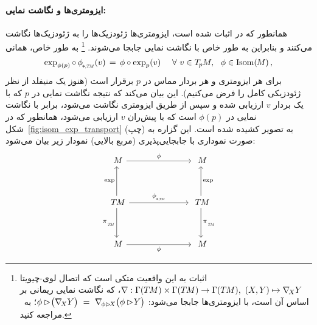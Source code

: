 \paragraph{ایزومتری‌ها و نگاشت نمایی:}
همانطور که در \cite{gallier2019diffgeom1} اثبات شده است، ایزومتری‌ها ژئودزیک‌ها را به ژئودزیک‌ها نگاشت می‌کنند و بنابراین به طور خاص با نگاشت نمایی جابجا می‌شوند.%
\footnote{\label{footnote:LeviCivita_isometry_invariance_persian}
    اثبات به این واقعیت متکی است که اتصال لوی-چیویتا $\nabla: \Gamma(T\mkern-1.5muM) \times \Gamma(T\mkern-1.5muM) \to \Gamma(T\mkern-1.5muM),\ (X,Y)\mapsto \nabla_{\!X}Y$، که نگاشت نمایی ریمانی بر اساس آن است، با ایزومتری‌ها جابجا می‌شود:
    $\phi\rhd\! \big( \nabla_{\!X}Y \big) \ =\ \nabla_{\mkern-2mu\phi\rhd\! X} \big(\phi\rhd\! Y\big)$؛
    به~\cite{gallier2019diffgeom1} مراجعه کنید.
}
به طور خاص، همانی
\begin{align}\label{eq:exp_isom_commutation}
    \exp_{\phi(p)} \circ\, \dphiTM (v) \,=\, \phi \circ \exp_p(v) \quad\ \forall\ v\in \TpM,\ \ \phi\in \IsomM \,,
\end{align}
برای هر ایزومتری و هر بردار مماس در $p$ برقرار است (هنوز یک منیفلد از نظر ژئودزیکی کامل را فرض می‌کنیم).
این بیان می‌کند که نتیجه نگاشت نمایی در $p$ که با یک بردار $v$ ارزیابی شده و سپس از طریق ایزومتری نگاشت می‌شود، برابر با نگاشت نمایی در $\phi(p)$ است که با پیش‌ران $v$ ارزیابی می‌شود، همانطور که در شکل~\ref{fig:isom_exp_transport} (چپ) به تصویر کشیده شده است.
این گزاره به صورت نموداری با جابجایی‌پذیری (مربع بالایی) نمودار زیر بیان می‌شود:
\begin{equation}
\begin{tikzcd}[column sep=70pt, row sep=35, font=\normalsize]
    M
        \arrow[r, "\phi"]
    &
    M
    \\
    \TM
        \arrow[r, "\dphiTM"]
        \arrow[d, "\piTM"']
        \arrow[u, "\exp"]
    &
    \TM
        \arrow[d, "\piTM"]
        \arrow[u, "\exp"']
    \\
    M
        \arrow[r, "\phi"']
    &
    M
\end{tikzcd}
\end{equation}


